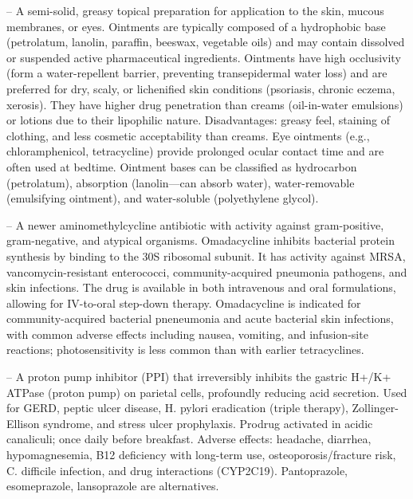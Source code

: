 -- A semi-solid, greasy topical preparation for application to the skin, mucous membranes, or eyes. Ointments are typically composed of a hydrophobic base (petrolatum, lanolin, paraffin, beeswax, vegetable oils) and may contain dissolved or suspended active pharmaceutical ingredients. Ointments have high occlusivity (form a water-repellent barrier, preventing transepidermal water loss) and are preferred for dry, scaly, or lichenified skin conditions (psoriasis, chronic eczema, xerosis). They have higher drug penetration than creams (oil-in-water emulsions) or lotions due to their lipophilic nature. Disadvantages: greasy feel, staining of clothing, and less cosmetic acceptability than creams. Eye ointments (e.g., chloramphenicol, tetracycline) provide prolonged ocular contact time and are often used at bedtime. Ointment bases can be classified as hydrocarbon (petrolatum), absorption (lanolin—can absorb water), water-removable (emulsifying ointment), and water-soluble (polyethylene glycol).

-- A newer aminomethylcycline antibiotic with activity against gram-positive, gram-negative, and atypical organisms. Omadacycline inhibits bacterial protein synthesis by binding to the 30S ribosomal subunit. It has activity against MRSA, vancomycin-resistant enterococci, community-acquired pneumonia pathogens, and skin infections. The drug is available in both intravenous and oral formulations, allowing for IV-to-oral step-down therapy. Omadacycline is indicated for community-acquired bacterial pneneumonia and acute bacterial skin infections, with common adverse effects including nausea, vomiting, and infusion-site reactions; photosensitivity is less common than with earlier tetracyclines.

-- A proton pump inhibitor (PPI) that irreversibly inhibits the gastric H+/K+ ATPase (proton pump) on parietal cells, profoundly reducing acid secretion. Used for GERD, peptic ulcer disease, H. pylori eradication (triple therapy), Zollinger-Ellison syndrome, and stress ulcer prophylaxis. Prodrug activated in acidic canaliculi; once daily before breakfast. Adverse effects: headache, diarrhea, hypomagnesemia, B12 deficiency with long-term use, osteoporosis/fracture risk, C. difficile infection, and drug interactions (CYP2C19). Pantoprazole, esomeprazole, lansoprazole are alternatives.

